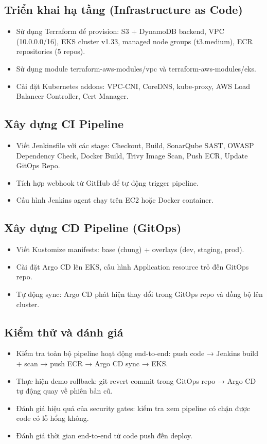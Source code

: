 \documentclass[12pt,a4paper]{article}
\begin{document}
\subsection{Triển khai hạ tầng (Infrastructure as Code)}
\begin{itemize}[leftmargin=*,nosep]
  \item Sử dụng Terraform để provision: S3 + DynamoDB backend, VPC (10.0.0.0/16), EKS cluster v1.33, managed node groups (t3.medium), ECR repositories (5 repos).
  \item Sử dụng module terraform-aws-modules/vpc và terraform-aws-modules/eks.
  \item Cài đặt Kubernetes addons: VPC-CNI, CoreDNS, kube-proxy, AWS Load Balancer Controller, Cert Manager.
\end{itemize}

\subsection{Xây dựng CI Pipeline}
\begin{itemize}[leftmargin=*,nosep]
  \item Viết Jenkinsfile với các stage: Checkout, Build, SonarQube SAST, OWASP Dependency Check, Docker Build, Trivy Image Scan, Push ECR, Update GitOps Repo.
  \item Tích hợp webhook từ GitHub để tự động trigger pipeline.
  \item Cấu hình Jenkins agent chạy trên EC2 hoặc Docker container.
\end{itemize}

\subsection{Xây dựng CD Pipeline (GitOps)}
\begin{itemize}[leftmargin=*,nosep]
  \item Viết Kustomize manifests: base (chung) + overlays (dev, staging, prod).
  \item Cài đặt Argo CD lên EKS, cấu hình Application resource trỏ đến GitOps repo.
  \item Tự động sync: Argo CD phát hiện thay đổi trong GitOps repo và đồng bộ lên cluster.
\end{itemize}

\subsection{Kiểm thử và đánh giá}
\begin{itemize}[leftmargin=*,nosep]
  \item Kiểm tra toàn bộ pipeline hoạt động end-to-end: push code → Jenkins build + scan → push ECR → Argo CD sync → EKS.
  \item Thực hiện demo rollback: git revert commit trong GitOps repo → Argo CD tự động quay về phiên bản cũ.
  \item Đánh giá hiệu quả của security gates: kiểm tra xem pipeline có chặn được code có lỗ hổng không.
  \item Đánh giá thời gian end-to-end từ code push đến deploy.
\end{itemize}
\end{document}
